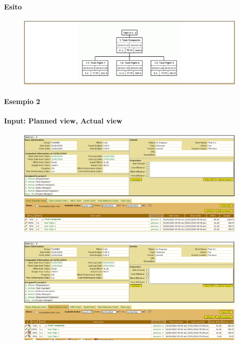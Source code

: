 \paragraph{Esito}
\begin{figure}[h!]
\centering
\includegraphics[width=\textwidth]{tests/TEST_WBS/4.1/4.1_2/Esempio_1/output.png}
\end{figure}
\newpage

\paragraph{Esempio 2}
\paragraph{Input: Planned view, Actual view}
\begin{figure}[h!]
\centering
\includegraphics[width=\textwidth]{tests/TEST_WBS/4.1/4.1_2/Esempio_2/input.png}
\end{figure}
\begin{figure}[h!]
\centering
\includegraphics[width=\textwidth]{tests/TEST_WBS/4.1/4.1_2/Esempio_2/input_actual.png}
\end{figure}
\newpage

